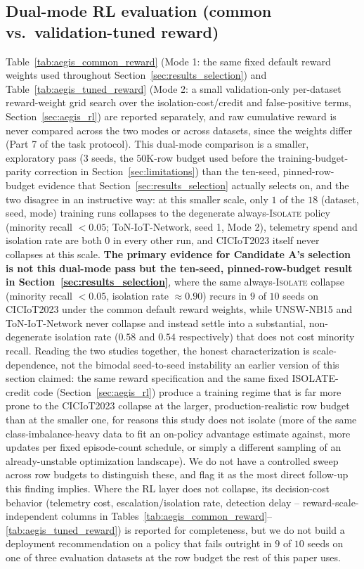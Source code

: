 \documentclass[journal]{IEEEtran}
\begin{document}
\subsection{Dual-mode RL evaluation (common vs.\ validation-tuned reward)}
\label{sec:results_rewardmodes}


Table~\ref{tab:aegis_common_reward} (Mode 1: the same fixed default reward
weights used throughout Section~\ref{sec:results_selection}) and
Table~\ref{tab:aegis_tuned_reward} (Mode 2: a small validation-only
per-dataset reward-weight grid search over the isolation-cost/credit and
false-positive terms, Section~\ref{sec:aegis_rl}) are reported separately, and
raw cumulative reward is never compared across the two modes or across
datasets, since the weights differ (Part 7 of the task protocol). This
dual-mode comparison is a smaller, exploratory pass (3 seeds, the
$50$K-row budget used before the training-budget-parity correction in
Section~\ref{sec:limitations}) than the ten-seed, pinned-row-budget
evidence that Section~\ref{sec:results_selection} actually selects on, and
the two disagree in an instructive way: at this smaller scale, only $1$ of
the $18$ (dataset, seed, mode) training runs collapses to the degenerate
always-\textsc{Isolate} policy (minority recall $<0.05$; ToN-IoT-Network,
seed 1, Mode 2), telemetry spend and isolation rate are both $0$ in every
other run, and CICIoT2023 itself never collapses at this scale.
\textbf{The primary evidence for Candidate A's selection is not this
dual-mode pass but the ten-seed, pinned-row-budget result in
Section~\ref{sec:results_selection}}, where the same always-\textsc{Isolate}
collapse (minority recall $<0.05$, isolation rate $\approx0.90$) recurs in
$9$ of $10$ seeds on CICIoT2023 under the common default reward weights,
while UNSW-NB15 and ToN-IoT-Network never collapse and instead settle into a
substantial, non-degenerate isolation rate ($0.58$ and $0.54$ respectively)
that does not cost minority recall. Reading the two studies together, the
honest characterization is scale-dependence, not the bimodal
seed-to-seed instability an earlier version of this section claimed: the
same reward specification and the same fixed ISOLATE-credit code
(Section~\ref{sec:aegis_rl}) produce a training regime that is far more
prone to the CICIoT2023 collapse at the larger, production-realistic row
budget than at the smaller one, for reasons this study does not isolate
(more of the same class-imbalance-heavy data to fit an on-policy
advantage estimate against, more updates per fixed episode-count schedule,
or simply a different sampling of an already-unstable optimization
landscape). We do not have a controlled sweep across row budgets to
distinguish these, and flag it as the most direct follow-up this finding
implies. Where the RL layer does not collapse, its decision-cost behavior
(telemetry cost, escalation/isolation rate, detection delay --
reward-scale-independent columns in
Tables~\ref{tab:aegis_common_reward}--\ref{tab:aegis_tuned_reward}) is
reported for completeness, but we do not build a deployment recommendation
on a policy that fails outright in $9$ of $10$ seeds on one of three
evaluation datasets at the row budget the rest of this paper uses.
\end{document}
